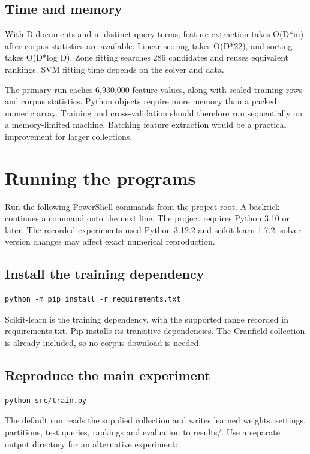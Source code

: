 \documentclass[12pt,a4paper]{article}
\begin{document}
\subsection{Time and memory}
With D documents and m distinct query terms, feature extraction takes O(D*m) after corpus statistics are available. Linear scoring takes O(D*22), and sorting takes O(D*log D). Zone fitting searches 286 candidates and reuses equivalent rankings. SVM fitting time depends on the solver and data.

The primary run caches 6,930,000 feature values, along with scaled training rows and corpus statistics. Python objects require more memory than a packed numeric array. Training and cross-validation should therefore run sequentially on a memory-limited machine. Batching feature extraction would be a practical improvement for larger collections.

\section{Running the programs}
Run the following PowerShell commands from the project root. A backtick continues a command onto the next line. The project requires Python 3.10 or later. The recorded experiments used Python 3.12.2 and scikit-learn 1.7.2; solver-version changes may affect exact numerical reproduction.

\subsection{Install the training dependency}
\begin{small}\begin{verbatim}
python -m pip install -r requirements.txt
\end{verbatim}\end{small}
Scikit-learn is the training dependency, with the supported range recorded in requirements.txt. Pip installs its transitive dependencies. The Cranfield collection is already included, so no corpus download is needed.

\subsection{Reproduce the main experiment}
\begin{small}\begin{verbatim}
python src/train.py
\end{verbatim}\end{small}
The default run reads the supplied collection and writes learned weights, settings, partitions, test queries, rankings and evaluation to results/. Use a separate output directory for an alternative experiment:
\end{document}
